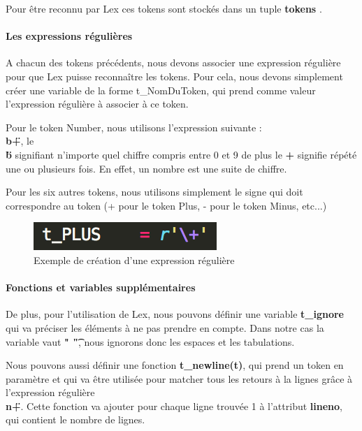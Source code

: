 \documentclass[a4paper,12pt]{article}
\begin{document}
				Pour être reconnu par Lex ces tokens sont stockés dans un tuple \textbf{tokens} .

			\paragraph{Les expressions régulières}

				A chacun des tokens précédents, nous devons associer une expression régulière pour que Lex puisse reconnaître les tokens.
				Pour cela, nous devons simplement créer une variable de la forme t\_NomDuToken, qui prend comme valeur l'expression régulière à associer à ce token.

				Pour le token Number, nous utilisons l'expression suivante : \textbf{\"\\b+\"}, le \textbf{\"\\b\"} signifiant n'importe quel chiffre compris entre 0 et 9 de plus le \textbf{+} signifie répété une ou plusieurs fois. En effet, un nombre est une suite de chiffre.

				Pour les six autres tokens, nous utilisons simplement le signe qui doit correspondre au token (+ pour le token Plus, - pour le token Minus, etc...)
			
				\begin{figure}[h!]
					\begin{center}
						\includegraphics[scale=1]{images/exp_regex}
						\caption{Exemple de création d'une expression régulière}
					\end{center}
				\end{figure}


			\paragraph{Fonctions et variables supplémentaires\\}

				De plus, pour l'utilisation de Lex, nous pouvons définir une variable \textbf{t\_ignore} qui va préciser les éléments à ne pas prendre en compte. Dans notre cas la variable vaut \textbf{" \t"}, nous ignorons donc les espaces et les tabulations.

				Nous pouvons aussi définir une fonction \textbf{t\_newline(t)}, qui prend un token en paramètre et qui va être utilisée pour matcher tous les retours à la lignes grâce à l'expression régulière \textbf{\"\\n+\"}. Cette fonction va ajouter pour chaque ligne trouvée 1 à l'attribut \textbf{lineno}, qui contient le nombre de lignes.
\end{document}
